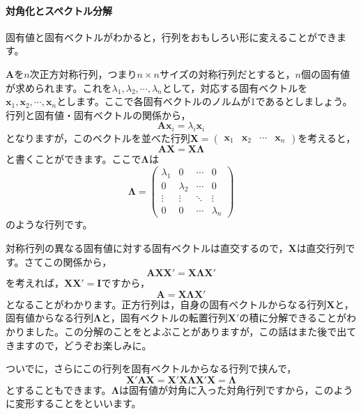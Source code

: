 \documentclass{ltjsbook}
\begin{document}
\paragraph{対角化とスペクトル分解}
固有値と固有ベクトルがわかると，行列をおもしろい形に変えることができます。

$\bm{A}$を$n$次正方対称行列，つまり$n \times n$サイズの対称行列だとすると，$n$個の固有値が求められます。これを$\lambda_1,\lambda_2,\cdots,\lambda_n$として，対応する固有ベクトルを$\bm{x}_1,\bm{x}_2,\cdots,\bm{x}_n$とします。ここで各固有ベクトルのノルムが1であるとしましょう。行列と固有値・固有ベクトルの関係から，
\[ \bm{Ax}_i = \lambda_i \bm{x}_i\]
となりますが，このベクトルを並べた行列$\bm{X}=\begin{pmatrix}\bm{x}_1&\bm{x}_2& \cdots & \bm{x}_n\end{pmatrix}$を考えると，
\[ \bm{AX} = \bm{X\Lambda} \]
と書くことができます。ここで$\bm{\Lambda}$は
\[ \bm{\Lambda} =
	\begin{pmatrix} \lambda_1 & 0         & \cdots & 0         \\
                0         & \lambda_2 & \cdots & 0         \\
                \vdots    & \vdots    & \ddots & \vdots    \\
                0         & 0         & \cdots & \lambda_n\end{pmatrix}
\]
のような行列です。

対称行列の異なる固有値に対する固有ベクトルは直交するので，$\bm{X}$は直交行列です。さてこの関係から，
\[ \bm{AXX}' = \bm{X\Lambda X}'\]
を考えれば，$\bm{XX}'=\bm{I}$ですから，
\[ \bm{A} = \bm{X\Lambda X}'\]
となることがわかります。正方行列は，自身の固有ベクトルからなる行列$\bm{X}$と，固有値からなる行列$\bm{\Lambda}$と，固有ベクトルの転置行列$\bm{X}'$の積に分解できることがわかりました。この分解のことをとよぶことがありますが，この話はまた後で出てきますので，どうぞお楽しみに。

ついでに，さらにこの行列を固有ベクトルからなる行列で挟んで，
\[ \bm{X}'\bm{AX} = \bm{X}'\bm{X\Lambda X}'\bm{X} = \bm{\Lambda}\]
とすることもできます。$\bm{\Lambda}$は固有値が対角に入った対角行列ですから，このように変形することをといいます。
\end{document}
